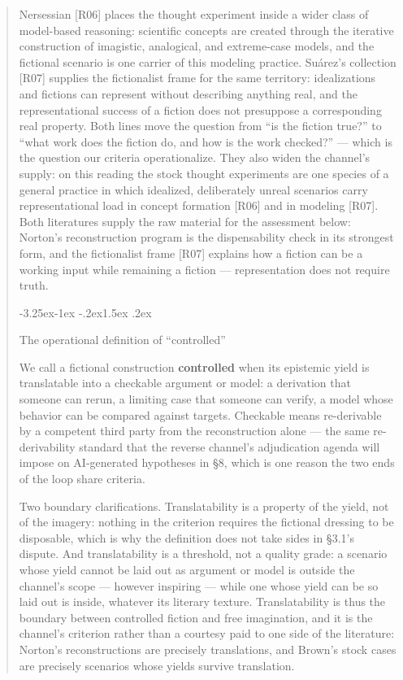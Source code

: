 \documentclass[11pt,a4paper]{article}
\makeatletter
\renewcommand\subsection{\@startsection{subsection}{2}{\z@}%
  {-3.25ex\@plus -1ex \@minus -.2ex}{1.5ex \@plus .2ex}%
  {\normalfont\large\bfseries\raggedright}}
\makeatother
\begin{document}
\begin{abstract}
Nersessian [R06] places the thought experiment inside a wider class of model-based reasoning: scientific concepts are created through the iterative construction of imagistic, analogical, and extreme-case models, and the fictional scenario is one carrier of this modeling practice. Suárez's collection [R07] supplies the fictionalist frame for the same territory: idealizations and fictions can represent without describing anything real, and the representational success of a fiction does not presuppose a corresponding real property. Both lines move the question from ``is the fiction true?'' to ``what work does the fiction do, and how is the work checked?'' — which is the question our criteria operationalize. They also widen the channel's supply: on this reading the stock thought experiments are one species of a general practice in which idealized, deliberately unreal scenarios carry representational load in concept formation [R06] and in modeling [R07]. Both literatures supply the raw material for the assessment below: Norton's reconstruction program is the dispensability check in its strongest form, and the fictionalist frame [R07] explains how a fiction can be a working input while remaining a fiction — representation does not require truth.

\subsection{The operational definition of ``controlled''}

We call a fictional construction \textbf{controlled} when its epistemic yield is translatable into a checkable argument or model: a derivation that someone can rerun, a limiting case that someone can verify, a model whose behavior can be compared against targets. Checkable means re-derivable by a competent third party from the reconstruction alone — the same re-derivability standard that the reverse channel's adjudication agenda will impose on AI-generated hypotheses in §8, which is one reason the two ends of the loop share criteria.

Two boundary clarifications. Translatability is a property of the yield, not of the imagery: nothing in the criterion requires the fictional dressing to be disposable, which is why the definition does not take sides in §3.1's dispute. And translatability is a threshold, not a quality grade: a scenario whose yield cannot be laid out as argument or model is outside the channel's scope — however inspiring — while one whose yield can be so laid out is inside, whatever its literary texture. Translatability is thus the boundary between controlled fiction and free imagination, and it is the channel's criterion rather than a courtesy paid to one side of the literature: Norton's reconstructions are precisely translations, and Brown's stock cases are precisely scenarios whose yields survive translation.


\end{abstract}
\end{document}
